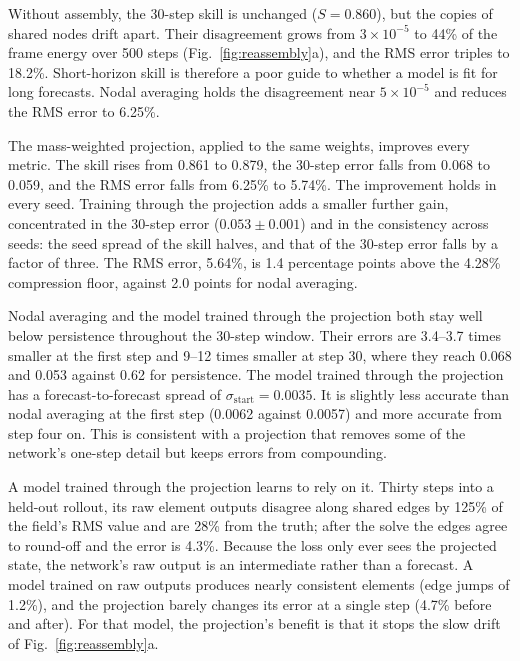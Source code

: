 \documentclass[conf]{new-aiaa}
\begin{document}
Without assembly, the 30-step skill is unchanged ($S=0.860$), but the copies of shared nodes drift apart. Their disagreement grows from $3\times10^{-5}$ to 44\% of the frame energy over 500 steps (Fig.~\ref{fig:reassembly}a), and the RMS error triples to 18.2\%. Short-horizon skill is therefore a poor guide to whether a model is fit for long forecasts. Nodal averaging holds the disagreement near $5\times10^{-5}$ and reduces the RMS error to 6.25\%.

The mass-weighted projection, applied to the same weights, improves every metric. The skill rises from 0.861 to 0.879, the 30-step error falls from 0.068 to 0.059, and the RMS error falls from 6.25\% to 5.74\%. The improvement holds in every seed. Training through the projection adds a smaller further gain, concentrated in the 30-step error ($0.053\pm0.001$) and in the consistency across seeds: the seed spread of the skill halves, and that of the 30-step error falls by a factor of three. The RMS error, 5.64\%, is 1.4 percentage points above the 4.28\% compression floor, against 2.0 points for nodal averaging.

Nodal averaging and the model trained through the projection both stay well below persistence throughout the 30-step window. Their errors are 3.4--3.7 times smaller at the first step and 9--12 times smaller at step 30, where they reach 0.068 and 0.053 against 0.62 for persistence. The model trained through the projection has a forecast-to-forecast spread of $\sigma_\mathrm{start}=0.0035$. It is slightly less accurate than nodal averaging at the first step (0.0062 against 0.0057) and more accurate from step four on. This is consistent with a projection that removes some of the network's one-step detail but keeps errors from compounding.

A model trained through the projection learns to rely on it. Thirty steps into a held-out rollout, its raw element outputs disagree along shared edges by 125\% of the field's RMS value and are 28\% from the truth; after the solve the edges agree to round-off and the error is 4.3\%. Because the loss only ever sees the projected state, the network's raw output is an intermediate rather than a forecast. A model trained on raw outputs produces nearly consistent elements (edge jumps of 1.2\%), and the projection barely changes its error at a single step (4.7\% before and after). For that model, the projection's benefit is that it stops the slow drift of Fig.~\ref{fig:reassembly}a.
\end{document}
